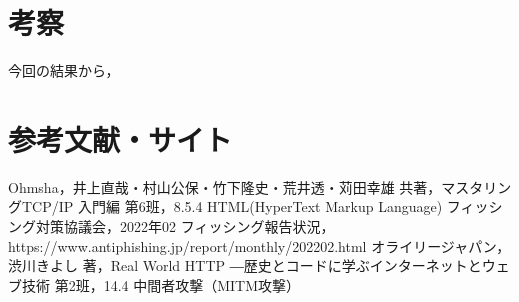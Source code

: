 \documentclass[dvipdfmx]{jsarticle}
\begin{document}
        \section{考察}
            今回の結果から，
        \section{参考文献・サイト}
            \begin{thebibliography}{9}
                 Ohmsha，井上直哉・村山公保・竹下隆史・荒井透・苅田幸雄 共著，マスタリングTCP/IP 入門編 第6班，8.5.4 HTML(HyperText Markup Language)
                 フィッシング対策協議会，2022年02 フィッシング報告状況，https://www.antiphishing.jp/report/monthly/202202.html
                 オライリージャパン，渋川きよし 著，Real World HTTP ―歴史とコードに学ぶインターネットとウェブ技術 第2班，14.4 中間者攻撃（MITM攻撃）
            \end{thebibliography}
\end{document}
